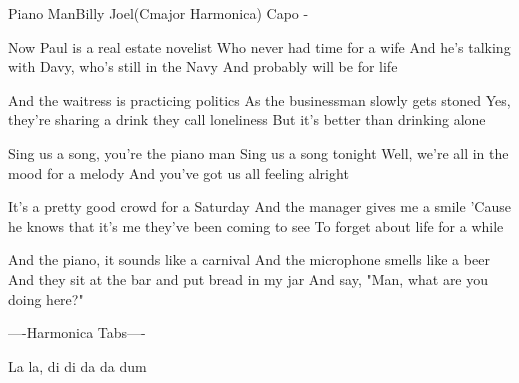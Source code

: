 \begin{song}{Piano Man}{Billy Joel}{(Cmajor Harmonica) Capo -}

    Now Paul is a real estate novelist
    Who never had time for a wife
    And he's talking with Davy, who's still in the Navy
    And probably will be for life


    And the waitress is practicing politics
    As the businessman slowly gets stoned
    Yes, they're sharing a drink they call loneliness
    But it's better than drinking alone

    Sing us a song, you're the piano man
    Sing us a song tonight
    Well, we're all in the mood for a melody
    And you've got us all feeling alright


    It's a pretty good crowd for a Saturday
    And the manager gives me a smile
    'Cause he knows that it's me they've been coming to see
    To forget about life for a while

    And the piano, it sounds like a carnival
    And the microphone smells like a beer
    And they sit at the bar and put bread in my jar
    And say, "Man, what are you doing here?"



    ----Harmonica Tabs----


    La la, di di da da dum 
\end{song}
